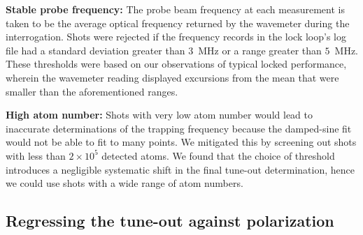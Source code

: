 	\textbf{Stable probe frequency:}		The probe beam frequency at each measurement is taken to be the average optical frequency returned by the wavemeter during the interrogation. Shots were rejected if the frequency records in the lock loop's log file had a standard deviation greater than $3$~MHz or a range greater than $5$~MHz. These thresholds were based on our observations of typical locked performance, wherein the wavemeter reading displayed excursions from the mean that were smaller than the aforementioned ranges.

	\textbf{High atom number:}		Shots with very low atom number would lead to inaccurate determinations of the trapping frequency because the damped-sine fit would not be able to fit to many points. We mitigated this by screening out shots with less than $2\times10^{5}$ detected atoms. We found that the choice of threshold introduces a negligible systematic shift in the final tune-out determination, hence we could use shots with a wide range of atom numbers.



\subsection{Regressing the tune-out against polarization}
 \label{sec:fitting}
	
	
